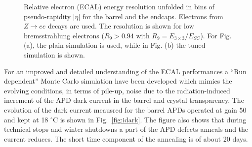 \documentclass[journal]{IEEEtran}
\begin{document}
\begin{figure}[!t]
  \begin{center}
    \caption{Relative electron (ECAL) energy resolution unfolded in bins of pseudo-rapidity $\vert\eta\vert$ for the barrel and the endcaps. Electrons from $Z\to ee$ decays are used. The resolution is shown for low bremsstrahlung electrons ($R_9>0.94$ with $R_9 = E_{3 \times 3} / E_{SC}$). For Fig. (a), the plain simulation is used, while in Fig. (b) the tuned simulation is shown. ~\label{energy_resol}}
  \end{center}
\end{figure}
%
For an improved and detailed understanding of the ECAL performances a ``Run dependent'' Monte Carlo simulation have been developed which mimics the evolving conditions, in terms of pile-up, noise due to the radiation-induced increment of the APD dark current in the barrel and crystal transparency. The evolution of the dark current meausred for the barrel APDs operated at gain 50 and kept at 18 $^\circ$C is shown in Fig.~\ref{fig:idark}. The figure also shows that during technical stops and winter shutdowns a part of the APD defects anneals and the current reduces. The short time component of the annealing is of about 20 days. 
%
\end{document}
